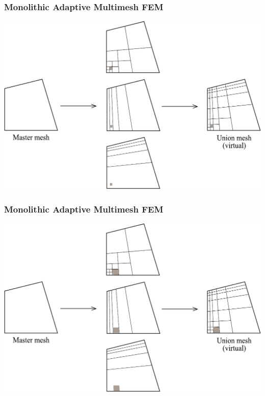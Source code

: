 \begin{frame}
  \frametitle{Monolithic Adaptive Multimesh FEM}
  \begin{center}
    \includegraphics[height=0.7\textheight]{multimesh/mm_4.pdf}
  \end{center}
\end{frame}

\begin{frame}
  \frametitle{Monolithic Adaptive Multimesh FEM}
  \begin{center}
    \includegraphics[height=0.7\textheight]{multimesh/mm_5.pdf}
  \end{center}
\end{frame}

